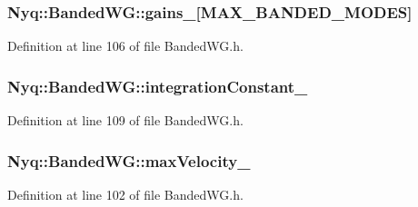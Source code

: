 \subsubsection[{\texorpdfstring{gains\+\_\+}{gains_}}]{ Nyq\+::\+Banded\+W\+G\+::gains\+\_\+\mbox{[}{\bf M\+A\+X\+\_\+\+B\+A\+N\+D\+E\+D\+\_\+\+M\+O\+D\+ES}\mbox{]}\hspace{0.3cm}{\ttfamily [protected]}}\hypertarget{class_nyq_1_1_banded_w_g_ab9be85990642478fd24711e9cb4bcf76}{}\label{class_nyq_1_1_banded_w_g_ab9be85990642478fd24711e9cb4bcf76}


Definition at line 106 of file Banded\+W\+G.\+h.

\subsubsection[{\texorpdfstring{integration\+Constant\+\_\+}{integrationConstant_}}]{ Nyq\+::\+Banded\+W\+G\+::integration\+Constant\+\_\+\hspace{0.3cm}{\ttfamily [protected]}}\hypertarget{class_nyq_1_1_banded_w_g_ac6889ab2b96c7cdc5a6a09c13ebe85a7}{}\label{class_nyq_1_1_banded_w_g_ac6889ab2b96c7cdc5a6a09c13ebe85a7}


Definition at line 109 of file Banded\+W\+G.\+h.

\subsubsection[{\texorpdfstring{max\+Velocity\+\_\+}{maxVelocity_}}]{ Nyq\+::\+Banded\+W\+G\+::max\+Velocity\+\_\+\hspace{0.3cm}{\ttfamily [protected]}}\hypertarget{class_nyq_1_1_banded_w_g_ae880f21388edcd26c7ff5f3201e156b9}{}\label{class_nyq_1_1_banded_w_g_ae880f21388edcd26c7ff5f3201e156b9}


Definition at line 102 of file Banded\+W\+G.\+h.

